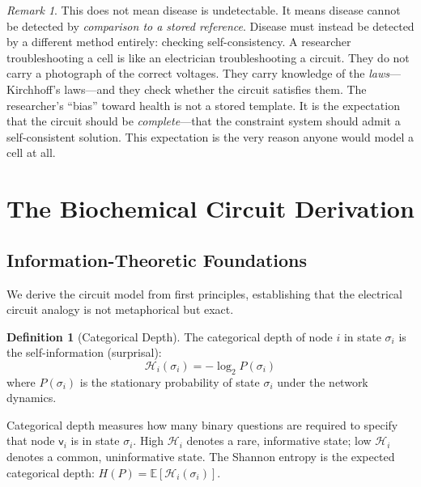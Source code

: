 \documentclass[10pt,twocolumn,a4paper]{article}
\theoremstyle{plain}
\theoremstyle{definition}
\newtheorem{definition}[theorem]{Definition}
\theoremstyle{remark}
\newtheorem{remark}[theorem]{Remark}
\newcommand{\fnode}{\mathsf{v}}
\newcommand{\Hcat}{\mathcal{H}}
\begin{document}
\begin{remark}
This does not mean disease is undetectable. It means disease cannot be detected by \emph{comparison to a stored reference}. Disease must instead be detected by a different method entirely: checking self-consistency. A researcher troubleshooting a cell is like an electrician troubleshooting a circuit. They do not carry a photograph of the correct voltages. They carry knowledge of the \emph{laws}---Kirchhoff's laws---and they check whether the circuit satisfies them. The researcher's ``bias'' toward health is not a stored template. It is the expectation that the circuit should be \emph{complete}---that the constraint system should admit a self-consistent solution. This expectation is the very reason anyone would model a cell at all.
\end{remark}

\section{The Biochemical Circuit Derivation}
\label{sec:circuit_derivation}

\subsection{Information-Theoretic Foundations}

We derive the circuit model from first principles, establishing that the electrical circuit analogy is not metaphorical but exact.

\begin{definition}[Categorical Depth]
\label{def:catdepth}
The categorical depth of node $i$ in state $\sigma_i$ is the self-information (surprisal):
\begin{equation}
    \Hcat_i(\sigma_i) = -\log_2 P(\sigma_i)
    \label{eq:catdepth}
\end{equation}
where $P(\sigma_i)$ is the stationary probability of state $\sigma_i$ under the network dynamics.
\end{definition}

Categorical depth measures how many binary questions are required to specify that node $\fnode_i$ is in state $\sigma_i$. High $\Hcat_i$ denotes a rare, informative state; low $\Hcat_i$ denotes a common, uninformative state. The Shannon entropy \citep{shannon1948} is the expected categorical depth: $H(P) = \mathbb{E}[\Hcat_i(\sigma_i)]$.
\end{document}

